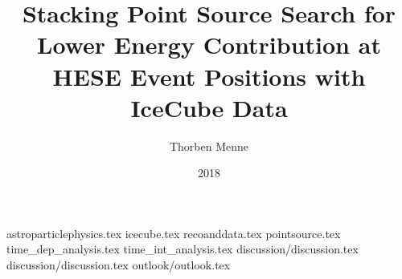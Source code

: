 

\author{Thorben Menne}
\title{Stacking Point Source Search for Lower Energy Contribution at HESE Event Positions with IceCube Data}
\date{2018}




\frontmatter
\maketitle
\tableofcontents

\mainmatter
{astroparticlephysics.tex}
{icecube.tex}
{recoanddata.tex}
{pointsource.tex}
{time_dep_analysis.tex}
{time_int_analysis.tex}
{discussion/discussion.tex}
{discussion/discussion.tex}
{outlook/outlook.tex}

\appendix

\backmatter
% 



